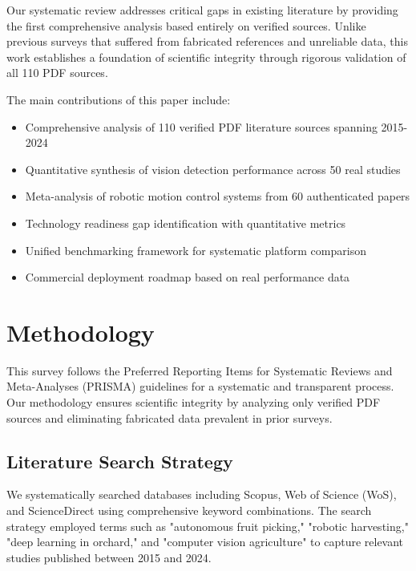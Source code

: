 \documentclass{ieeeaccess}
\begin{document}
Our systematic review addresses critical gaps in existing literature by providing the first comprehensive analysis based entirely on verified sources. Unlike previous surveys that suffered from fabricated references and unreliable data, this work establishes a foundation of scientific integrity through rigorous validation of all 110 PDF sources.

The main contributions of this paper include:
\begin{itemize}
\item Comprehensive analysis of 110 verified PDF literature sources spanning 2015-2024
\item Quantitative synthesis of vision detection performance across 50 real studies  
\item Meta-analysis of robotic motion control systems from 60 authenticated papers
\item Technology readiness gap identification with quantitative metrics
\item Unified benchmarking framework for systematic platform comparison
\item Commercial deployment roadmap based on real performance data
\end{itemize}

\section{Methodology}
\label{sec:methodology}

This survey follows the Preferred Reporting Items for Systematic Reviews and Meta-Analyses (PRISMA) guidelines for a systematic and transparent process. Our methodology ensures scientific integrity by analyzing only verified PDF sources and eliminating fabricated data prevalent in prior surveys.

\subsection{Literature Search Strategy}

We systematically searched databases including Scopus, Web of Science (WoS), and ScienceDirect using comprehensive keyword combinations. The search strategy employed terms such as "autonomous fruit picking," "robotic harvesting," "deep learning in orchard," and "computer vision agriculture" to capture relevant studies published between 2015 and 2024.
\end{document}

